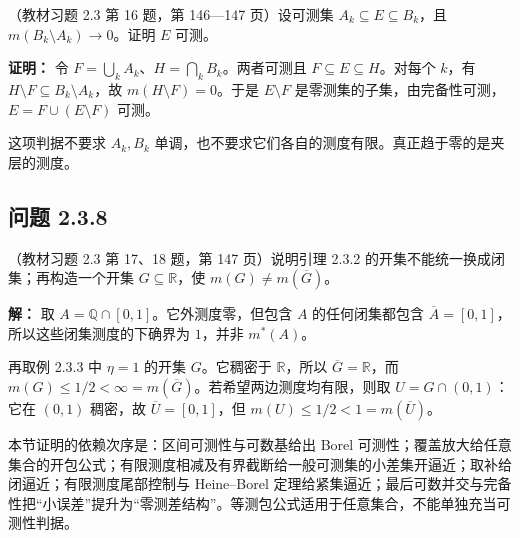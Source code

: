 \documentclass[11pt,a4paper]{article}
\begin{document}
（教材习题 2.3 第 16 题，第 146---147 页）设可测集
\(A_k\subseteq E\subseteq B_k\)，且 \(m(B_k\setminus A_k)\to0\)。证明
\(E\) 可测。

\textbf{证明：} 令 \(F=\bigcup_kA_k\)、\(H=\bigcap_kB_k\)。两者可测且
\(F\subseteq E\subseteq H\)。对每个 \(k\)，有
\(H\setminus F\subseteq B_k\setminus A_k\)，故
\(m(H\setminus F)=0\)。于是 \(E\setminus F\)
是零测集的子集，由完备性可测，\(E=F\cup(E\setminus F)\) 可测。

这项判据不要求 \(A_k,B_k\)
单调，也不要求它们各自的测度有限。真正趋于零的是夹层的测度。

\subsection{问题 2.3.8}\label{ux95eeux9898-2.3.8}

（教材习题 2.3 第 17、18 题，第 147 页）说明引理 2.3.2
的开集不能统一换成闭集；再构造一个开集 \(G\subseteq\mathbb R\)，使
\(m(G)\ne m(\overline G)\)。

\textbf{解：} 取 \(A=\mathbb Q\cap[0,1]\)。它外测度零，但包含 \(A\)
的任何闭集都包含 \(\overline A=[0,1]\)，所以这些闭集测度的下确界为
\(1\)，并非 \(m^*(A)\)。

再取例 2.3.3 中 \(\eta=1\) 的开集 \(G\)。它稠密于 \(\mathbb R\)，所以
\(\overline G=\mathbb R\)，而
\(m(G)\le1/2<\infty=m(\overline G)\)。若希望两边测度均有限，则取
\(U=G\cap(0,1)\)：它在 \((0,1)\) 稠密，故 \(\overline U=[0,1]\)，但
\(m(U)\le1/2<1=m(\overline U)\)。

本节证明的依赖次序是：区间可测性与可数基给出 Borel
可测性；覆盖放大给任意集合的开包公式；有限测度相减及有界截断给一般可测集的小差集开逼近；取补给闭逼近；有限测度尾部控制与
Heine--Borel
定理给紧集逼近；最后可数并交与完备性把``小误差''提升为``零测差结构''。等测包公式适用于任意集合，不能单独充当可测性判据。
\end{document}

